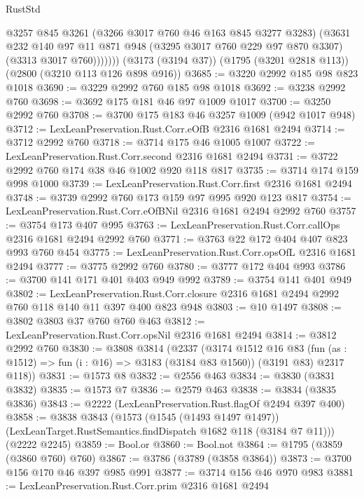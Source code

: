 \begin{lexlean}{RustStd}
\begin{coremodule}
              @3257
              @845
              @3261
              (@3266 @3017 @760 @46 @163 @845 @3277 @3283)
              (@3631
                @232
                @140
                @97
                @11
                @871
                @948
                (@3295 @3017 @760 @229 @97 @870 @3307)
                (@3313 @3017 @760)))))))
    (@3173 (@3194 @37))
    (@1795 (@3201 @2818 @113))
    (@2800 (@3210 @113 @126 @898 @916))
@3685 := @3220 @2992 @185 @98 @823 @1018
@3690 := @3229 @2992 @760 @185 @98 @1018
@3692 := @3238 @2992 @760
@3698 := @3692 @175 @181 @46 @97 @1009 @1017
@3700 := @3250 @2992 @760
@3708 := @3700 @175 @183 @46 @3257 @1009 (@942 @1017 @948)
@3712 := LexLeanPreservation.Rust.Corr.eOfB @2316 @1681 @2494
@3714 := @3712 @2992 @760
@3718 := @3714 @175 @46 @1005 @1007
@3722 := LexLeanPreservation.Rust.Corr.second @2316 @1681 @2494
@3731 := @3722 @2992 @760 @174 @38 @46 @1002 @920 @118 @817
@3735 := @3714 @174 @159 @998 @1000
@3739 := LexLeanPreservation.Rust.Corr.first @2316 @1681 @2494
@3748 := @3739 @2992 @760 @173 @159 @97 @995 @920 @123 @817
@3754 := LexLeanPreservation.Rust.Corr.eOfBNil @2316 @1681 @2494 @2992 @760
@3757 := @3754 @173 @407 @995
@3763 := LexLeanPreservation.Rust.Corr.callOps @2316 @1681 @2494 @2992 @760
@3771 := @3763 @22 @172 @404 @407 @823 @993 @760 @454
@3775 := LexLeanPreservation.Rust.Corr.opsOfL @2316 @1681 @2494
@3777 := @3775 @2992 @760
@3780 := @3777 @172 @404 @993
@3786 := @3700 @141 @171 @401 @403 @949 @992
@3789 := @3754 @141 @401 @949
@3802 := LexLeanPreservation.Rust.Corr.closure
    @2316
    @1681
    @2494
    @2992
    @760
    @118
    @140
    @11
    @397
    @400
    @823
    @948
@3803 := @10 @1497
@3808 := @3802 @3803 @37 @760 @760 @463
@3812 := LexLeanPreservation.Rust.Corr.opsNil @2316 @1681 @2494
@3814 := @3812 @2992 @760
@3830 := @3808
    @3814
    (@2337
      (@3174
        @1512
        @16
        @83
        (fun (as : @1512) => fun (i : @16) => @3183 (@3184 @83 @1560))
        (@3191 @83)
        @2317
        @118))
@3831 := @1573 @8
@3832 := @2556 @463
@3834 := @3830 (@3831 @3832)
@3835 := @1573 @7
@3836 := @2579 @463
@3838 := @3834 (@3835 @3836)
@3843 := @2222 (LexLeanPreservation.Rust.flagOf @2494 @397 @400)
@3858 := @3838
    @3843
    (@1573
      (@1545 (@1493 @1497 @1497))
      (LexLeanTarget.RustSemantics.findDispatch @1682 @118 (@3184 @7 @11)))
    (@2222 @2245)
@3859 := Bool.or
@3860 := Bool.not
@3864 := @1795 (@3859 (@3860 @760) @760)
@3867 := @3786 (@3789 (@3858 @3864))
@3873 := @3700 @156 @170 @46 @397 @985 @991
@3877 := @3714 @156 @46 @970 @983
@3881 := LexLeanPreservation.Rust.Corr.prim @2316 @1681 @2494

\end{coremodule}
\end{lexlean}
